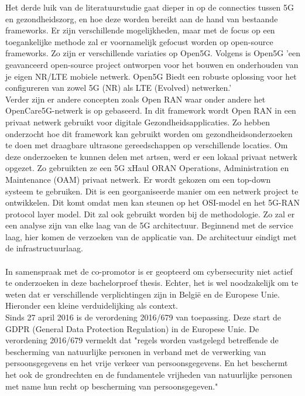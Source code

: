 Het derde luik van de literatuurstudie gaat dieper in op de connecties tussen 5G en gezondheidszorg, en hoe deze worden bereikt aan de hand van bestaande frameworks. Er zijn verschillende mogelijkheden, maar met de focus op een toegankelijke methode zal er voornamelijk gefocust worden op open-source frameworks. Zo zijn er verschillende variaties op Open5G. Volgens \textcite{Open5GS2024} is Open5G 'een geavanceerd open-source project ontworpen voor het bouwen en onderhouden van je eigen NR/LTE mobiele netwerk. Open5G Biedt een robuste oplossing voor het configureren van zowel 5G (NR) als LTE (Evolved) netwerken.' \\ Verder zijn er andere concepten zoals Open RAN waar onder andere het OpenCare5G-netwerk is op gebaseerd. In dit framework wordt Open RAN in een privaat netwerk gebruikt voor digitale Gezondheidsapplicaties. Zo hebben \textcite{de2023opencare5g} onderzocht hoe dit framework kan gebruikt worden om gezondheidsonderzoeken te doen met draagbare ultrasone gereedschappen op verschillende locaties. Om deze onderzoeken te kunnen delen met artsen, werd er een lokaal privaat netwerk opgezet. Zo gebruikten ze een 5G xHaul ORAN Operations, Administration en Maintenance (OAM) privaat netwerk. Er wordt gekozen om een top-down systeem te gebruiken. Dit is een georganiseerde manier om een netwerk project te ontwikkelen. Dit komt omdat men kan steunen op het OSI-model en het 5G-RAN protocol layer model. Dit zal ook gebruikt worden bij de methodologie. Zo zal er een analyse zijn van elke laag van de 5G architectuur. Beginnend met de service laag, hier komen de verzoeken van de applicatie van. De architectuur eindigt met de infrastructuurlaag. \autocite{de2023opencare5g}
\\\\
In samenspraak met de co-promotor is er geopteerd om cybersecurity niet actief te onderzoeken in deze bachelorproef thesis. Echter, het is wel noodzakelijk om te weten dat er verschillende verplichtingen zijn in België en de Europese Unie. Hieronder een kleine verduidelijking als context.
\\
Sinds 27 april 2016 is de verordening 2016/679 van toepassing. Deze start de GDPR (General Data Protection Regulation) in de Europese Unie. De verordening 2016/679 vermeldt dat "regels worden vastgelegd betreffende de bescherming van natuurlijke personen in verband met de verwerking van persoonsgegevens en het vrije verkeer van persoonsgegevens. En het beschermt het ook de grondrechten en de fundamentele vrijheden van natuurlijke personen met name hun recht op bescherming van persoonsgegeven."\\ \autocite{gdpr2016} 
